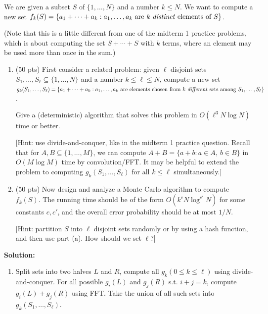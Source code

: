 \documentclass[11pt]{article}
\begin{document}
\begin{description}
\newpage
\item[Problem 5.2:]
We are given a subset $S$ of $\{1,\ldots,N\}$ and a number $k\le N$.
We want to compute a new set $f_k(S)=\{ a_1+\cdots+a_k: \mbox{$a_1,\ldots,a_k$ are $k$
\emph{distinct} elements of $S$}\}$.

(Note that this is a little different from one of the midterm 1 practice problems, which
is about computing the set $S+\cdots+S$ with $k$ terms, where an element may be used
more than once in the sum.)

\begin{enumerate}
\item[(a)] (50 pts)
First consider a related problem: given $\ell$ disjoint sets $S_1,\ldots,S_\ell\subseteq\{1,\ldots,N\}$
and a number $k\le\ell\le N$,
compute a new set $g_k(S_1,\ldots,S_\ell)=\{ a_1+\cdots+a_k: \mbox{$a_1,\ldots,a_k$ are elements chosen from $k$ \emph{different} sets among $S_1,\ldots,S_\ell$}\}$.

Give a (deterministic) algorithm that solves this problem in $O(\ell^3 N\log N)$ time or better.

[Hint: use divide-and-conquer, like in the midterm 1 practice question.
Recall that for $A,B\subseteq\{1,\ldots,M\}$, we can compute
$A+B=\{a+b: a\in A,\ b\in B\}$ in $O(M\log M)$ time by convolution/FFT\@.
It may be helpful to extend the problem to computing $g_k(S_1,\ldots,S_\ell)$ for all $k\le \ell$ simultaneously.]

\medskip
\item[(b)] (50 pts)
Now design and analyze a Monte Carlo algorithm to compute $f_k(S)$.  The running time should be of the form
$O(k^c N\log^{c'}N)$ for some constants $c,c'$, and the overall 
error probability should be at most $1/N$.

[Hint: partition $S$ into $\ell$ disjoint sets randomly or by using a hash function, and then use part (a).  How should we set $\ell$?]
\end{enumerate}


\newpage
\textbf{Solution:}
\begin{enumerate}
  \item[(a)]
  Split sets into two halves $L$ and $R$, compute all $g_k (0 \le k \le \ell)$ using divide-and-conquer. 
  For all possible $g_i(L)$ and $g_j(R)$ s.t. $i+j=k$, compute $g_i(L) + g_j(R)$ using FFT. 
  Take the union of all such sets into $g_k(S_1,\ldots,S_\ell)$.


\end{enumerate}
\end{description}
\end{document}
